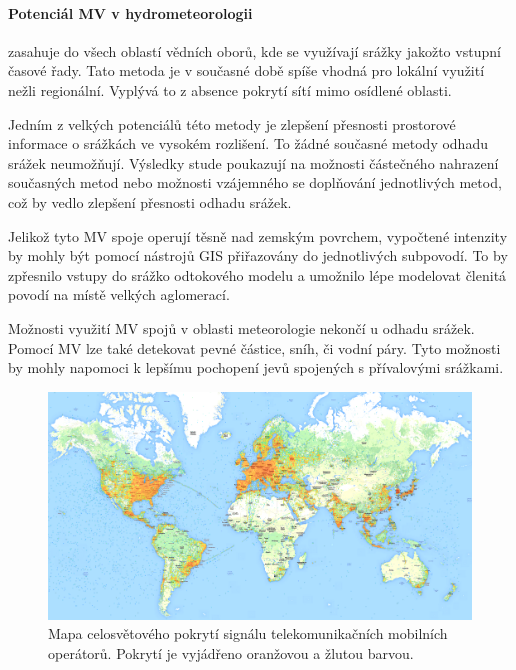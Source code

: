 \documentclass[a4paper,12pt]{report}
\begin{document}
\paragraph*{Potenciál MV v hydrometeorologii} zasahuje do všech oblastí vědních oborů, kde se využívají srážky jakožto vstupní časové řady. Tato metoda je v současné době spíše vhodná pro lokální využití nežli regionální. Vyplývá to z absence pokrytí sítí mimo osídlené oblasti. 

Jedním z velkých potenciálů této metody je zlepšení přesnosti prostorové informace o srážkách ve vysokém rozlišení. To žádné současné metody odhadu srážek neumožňují. Výsledky stude\cite{mv2} poukazují na možnosti částečného nahrazení současných metod nebo možnosti vzájemného se doplňování jednotlivých metod, což by vedlo zlepšení přesnosti odhadu srážek. 

Jelikož tyto MV spoje operují těsně nad zemským povrchem, vypočtené intenzity by mohly být pomocí nástrojů \acs{GIS} přiřazovány do jednotlivých subpovodí. To by zpřesnilo vstupy do srážko odtokového modelu a umožnilo lépe modelovat členitá povodí na místě velkých aglomerací.

Možnosti využití MV spojů v oblasti meteorologie nekončí u odhadu srážek. Pomocí MV lze také detekovat pevné částice, sníh, či vodní páry. Tyto možnosti by mohly napomoci k lepšímu pochopení jevů spojených s přívalovými srážkami.\cite{mv2}
\begin{figure}[h!]
    \centering
    \includegraphics[width=1\textwidth]{./img/srazky/opensignalmap.png}
    \caption[Porytí tel. sítí]{\centering Mapa celosvětového pokrytí signálu telekomunikačních mobilních operátorů. Pokrytí je vyjádřeno oranžovou a žlutou barvou. \footnotemark }
 \end{figure}   
\end{document}
